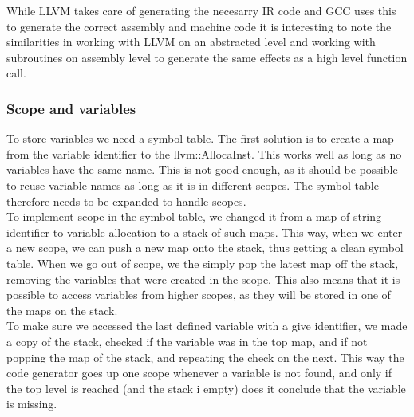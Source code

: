 While LLVM takes care of generating the necesarry IR code and GCC uses this to
generate the correct assembly and machine code it is interesting to note the
similarities in working with LLVM on an abstracted level and working with subroutines on
assembly level to generate the same effects as a high level function call.


\subsubsection{Scope and variables}
To store variables we need a symbol table. The first solution is to create a map from the variable identifier to the llvm::AllocaInst. This works well as long as no variables have the same name. This is not good enough, as it should be possible to reuse variable names as long as it is in different scopes. The symbol table therefore needs to be expanded to handle scopes.\\
To implement scope in the symbol table, we changed it from a map of string identifier to variable allocation to a stack of such maps. This way, when we enter a new scope, we can push a new map onto the stack, thus getting a clean symbol table. When we go out of scope, we the simply pop the latest map off the stack, removing the variables that were created in the scope. This also means that it is possible to access variables from higher scopes, as they will be stored in one of the maps on the stack.\\
To make sure we accessed the last defined variable with a give identifier, we made a copy of the stack, checked if the variable was in the top map, and if not popping the map of the stack, and repeating the check on the next. This way the code generator goes up one scope whenever a variable is not found, and only if the top level is reached (and the stack i empty) does it conclude that the variable is missing.

